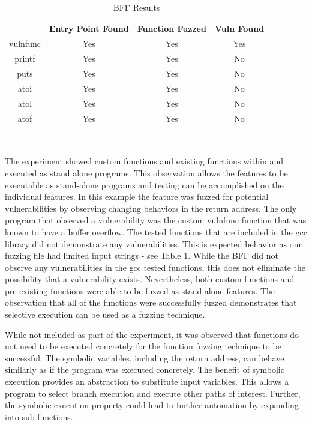 \documentclass[conference]{IEEEtran}
\begin{document}
\begin{table}
 \begin{tabular}{|c|c|c|c|} 
 \hline
 & Entry Point Found & Function Fuzzed & Vuln Found  \\ 
 \hline
   vulnfunc & 
   Yes & 
   Yes & 
   Yes \\
\hline
   printf & 
   Yes & 
   Yes & 
   No \\
\hline
   puts & 
   Yes & 
   Yes & 
   No \\
\hline
   atoi & 
   Yes & 
   Yes & 
   No \\
\hline
   atol & 
   Yes & 
   Yes & 
   No \\
\hline
   atof & 
   Yes & 
   Yes & 
   No \\
\hline
\end{tabular}
\bigskip
\\
\caption{BFF Results}
\end{table}

The experiment showed custom functions and existing functions within and executed as stand alone programs. This observation allows the features to be executable as stand-alone programs and testing can be accomplished on the individual features. In this example the feature was fuzzed for potential vulnerabilities by observing changing behaviors in the return address. The only program that observed a vulnerability was the custom vulnfunc function that was known to have a buffer overflow. The tested functions that are included in the gcc library did not demonstrate any vulnerabilities. This is expected behavior as our fuzzing file had limited input strings - see Table 1. While the BFF did not observe any vulnerabilities in the gcc tested functions, this does not eliminate the possibility that a vulnerability exists. Nevertheless, both custom functions and pre-existing functions were able to be fuzzed as stand-alone features. The observation that all of the functions were successfully fuzzed demonstrates that selective execution can be used as a fuzzing technique. 

While not included as part of the experiment, it was observed that functions do not need to be executed concretely for the function fuzzing technique to be successful. The symbolic variables, including the return address, can behave similarly as if the program was executed concretely. The benefit of symbolic execution provides an abstraction to substitute input variables. This allows a program to select branch execution and execute other paths of interest. Further, the symbolic execution property could lead to further automation by expanding into sub-functions. 
\end{document}
